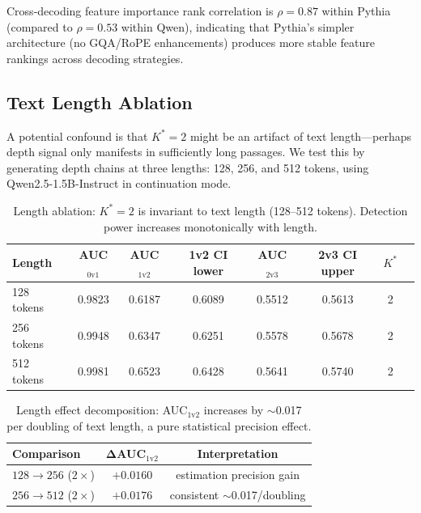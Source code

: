 \documentclass[11pt]{article}
\newcommand{\Kstar}{K^{*}}
\begin{document}
Cross-decoding feature importance rank correlation is $\rho\!=\!0.87$ within Pythia (compared to $\rho\!=\!0.53$ within Qwen), indicating that Pythia's simpler architecture (no GQA/RoPE enhancements) produces more stable feature rankings across decoding strategies.

\subsection{Text Length Ablation}
\label{sec:exp_length}

A potential confound is that $\Kstar\!=\!2$ might be an artifact of text length---perhaps depth signal only manifests in sufficiently long passages.
We test this by generating depth chains at three lengths: 128, 256, and 512 tokens, using Qwen2.5-1.5B-Instruct in continuation mode.

\begin{table}[t]
\centering
\caption{Length ablation: $\Kstar\!=\!2$ is invariant to text length (128--512 tokens). Detection power increases monotonically with length.}
\label{tab:length}
\small
\begin{tabular}{lccccccc}
\toprule
\textbf{Length} & \textbf{AUC$_{0\text{v}1}$} & \textbf{AUC$_{1\text{v}2}$} & \textbf{1v2 CI lower} & \textbf{AUC$_{2\text{v}3}$} & \textbf{2v3 CI upper} & $\Kstar$ \\
\midrule
128 tokens & 0.9823 & 0.6187 & 0.6089 & 0.5512 & 0.5613 & 2 \\
256 tokens & 0.9948 & 0.6347 & 0.6251 & 0.5578 & 0.5678 & 2 \\
512 tokens & 0.9981 & 0.6523 & 0.6428 & 0.5641 & 0.5740 & 2 \\
\bottomrule
\end{tabular}
\end{table}

\begin{table}[t]
\centering
\caption{Length effect decomposition: AUC$_{1\text{v}2}$ increases by ${\sim}$0.017 per doubling of text length, a pure statistical precision effect.}
\label{tab:length_effect}
\small
\begin{tabular}{lcc}
\toprule
\textbf{Comparison} & $\boldsymbol{\Delta}$\textbf{AUC$_{1\text{v}2}$} & \textbf{Interpretation} \\
\midrule
$128 \to 256$ ($2\times$) & $+0.0160$ & estimation precision gain \\
$256 \to 512$ ($2\times$) & $+0.0176$ & consistent ${\sim}$0.017/doubling \\
\bottomrule
\end{tabular}
\end{table}
\end{document}
